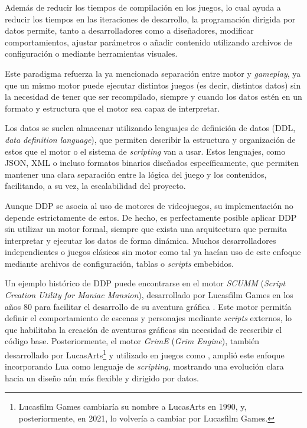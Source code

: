 \medskip

Además de reducir los tiempos de compilación en los juegos, lo cual ayuda a reducir los tiempos en las iteraciones de desarrollo, la programación dirigida por datos permite, tanto a desarrolladores como a diseñadores, modificar comportamientos, ajustar parámetros o añadir contenido utilizando archivos de configuración o mediante herramientas visuales.

\medskip

Este paradigma refuerza la ya mencionada separación entre motor y \textit{gameplay}, ya que un mismo motor puede ejecutar distintos juegos (es decir, distintos datos) sin la necesidad de tener que ser recompilado, siempre y cuando los datos estén en un formato y estructura que el motor sea capaz de interpretar.

\medskip

Los datos se suelen almacenar utilizando lenguajes de definición de datos (DDL, \textit{data definition language}), que permiten describir la estructura y organización de estos que el motor o el sistema de \textit{scripting} van a usar. Estos lenguajes, como JSON, XML o incluso formatos binarios diseñados específicamente, que permiten mantener una clara separación entre la lógica del juego y los contenidos, facilitando, a su vez, la escalabilidad del proyecto.

\medskip

Aunque DDP se asocia al uso de motores de videojuegos, su implementación no depende estrictamente de estos. De hecho, es perfectamente posible aplicar DDP sin utilizar un motor formal, siempre que exista una arquitectura que permita interpretar y ejecutar los datos de forma dinámica. Muchos desarrolladores independientes o juegos clásicos sin motor como tal ya hacían uso de este enfoque mediante archivos de configuración, tablas o \textit{scripts} embebidos.

\medskip

Un ejemplo histórico de DDP puede encontrarse en el motor \textit{SCUMM} (\textit{Script Creation Utility for Maniac Mansion}), desarrollado por Lucasfilm Games en los años 80 para facilitar el desarrollo de su aventura gráfica \cite{maniacmansion}. Este motor permitía definir el comportamiento de escenas y personajes mediante \textit{scripts} externos, lo que habilitaba la creación de aventuras gráficas sin necesidad de reescribir el código base. Posteriormente, el motor \textit{GrimE} (\textit{Grim Engine}), también desarrollado por LucasArts\footnote{Lucasfilm Games cambiaría su nombre a LucasArts en 1990, y, posteriormente, en 2021, lo volvería a cambiar por Lucasfilm Games.} y utilizado en juegos como \cite{grimfandango}, amplió este enfoque incorporando Lua como lenguaje de \textit{scripting}, mostrando una evolución clara hacia un diseño aún más flexible y dirigido por datos.

